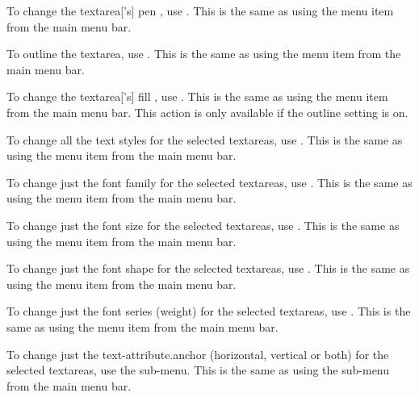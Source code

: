 To change the \gls{textarea}['s] pen , use
. This is the same as using the
 menu item from the main menu bar.


To outline the \gls{textarea}, use .
This is the same as using the  menu item
from the main menu bar.


To change the \gls{textarea}['s] fill , use
. This is the same as using the
 menu item from the main menu bar.
This action is only available if the outline setting is on.


To change all the text styles for the selected \glspl{textarea},
use . This is the same as using the
 menu item from the main menu bar.


To change just the font family for the selected \glspl{textarea},
use . This is the same as using the
 menu item from the main menu bar.


To change just the font size for the selected \glspl{textarea},
use . This is the same as using the
 menu item from the main menu bar.


To change just the font shape for the selected \glspl{textarea},
use . This is the same as using the
 menu item from the main menu bar.


To change just the font series (weight) for the selected \glspl{textarea},
use . This is the same as using the
 menu item from the main menu bar.


To change just the \gls{text-attribute.anchor} (horizontal, vertical or both) for the
selected \glspl{textarea}, use the 
sub-menu. This is the same as using the
 sub-menu from the main menu
bar.

